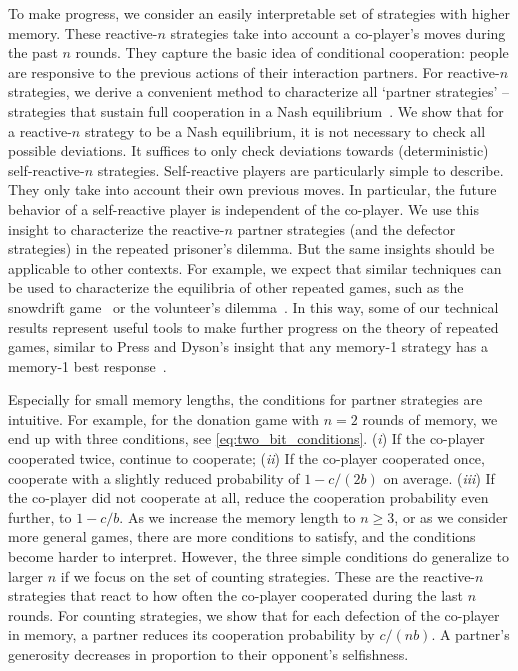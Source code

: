\documentclass[9pt,twocolumn,twoside]{pnas-new}
\begin{document}
To make progress, we consider an easily interpretable set of strategies with higher memory. 
These reactive-$n$ strategies take into account a co-player's moves during the past $n$ rounds. 
They capture the basic idea of conditional cooperation: people are responsive to the previous actions of their interaction partners. 
For reactive-$n$ strategies, we derive a convenient method to characterize all `partner strategies' -- strategies that sustain full cooperation in a Nash equilibrium~\citep{akin:EGADS:2016,Hilbe:GEB:2015}. 
We show that for a reactive-$n$ strategy to be a Nash equilibrium, it is not necessary to check all possible deviations. 
It suffices to only check deviations towards (deterministic) self-reactive-$n$ strategies. 
Self-reactive players are particularly simple to describe. 
They only take into account their own previous moves. 
In particular, the future behavior of a self-reactive player is independent of the co-player. 
We use this insight to characterize the reactive-$n$ partner strategies (and the defector strategies) in the repeated prisoner's dilemma.
But the same insights should be applicable to other contexts. 
For example, we expect that similar techniques can be used to characterize the equilibria of other repeated games, such as the snowdrift game~\citep{doebeli:EL:2005} or the volunteer's dilemma~\citep{diekmann:jcr:1985}.  
In this way, some of our technical results represent useful tools to make further progress on the theory of repeated games, similar to Press and Dyson's insight that any memory-1 strategy has a memory-1 best response~\citep{press:PNAS:2012}. 

Especially for small memory lengths, the conditions for partner strategies are intuitive. 
For example, for the donation game with $n\!=\!2$ rounds of memory, we end up with three conditions, see \eqref{eq:two_bit_conditions}.
({\it i}) If the co-player cooperated twice, continue to cooperate; 
({\it ii}) If the co-player cooperated once, cooperate with a slightly reduced probability of $1\!-\!c/(2b)$ on average. 
({\it iii}) If the co-player did not cooperate at all, reduce the cooperation probability even further, to $1\!-\!c/b$. 
As we increase the memory length to $n\!\ge\!3$, or as we consider more general games, there are more conditions to satisfy, and the conditions become harder to interpret. 
However, the three simple conditions do generalize to larger $n$ if we focus on the set of counting strategies. 
These are the reactive-$n$ strategies that react to how often the co-player cooperated during the last $n$ rounds. 
For counting strategies, we show that for each defection of the co-player in memory, a partner reduces its cooperation probability by $c/(nb)$. 
A partner's generosity decreases in proportion to their opponent's selfishness. 
\end{document}
